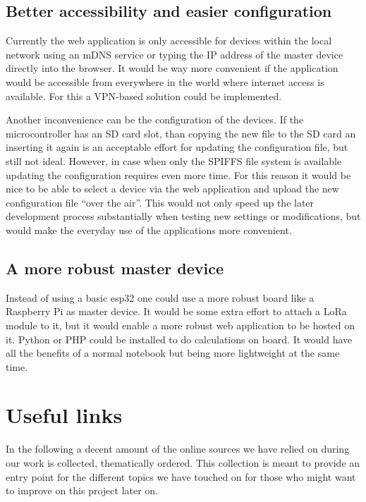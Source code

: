 \documentclass[11pt,a4paper]{article}
\numberwithin{equation}{section}   %
\numberwithin{figure}{section}     %
\numberwithin{table}{section}      %
\begin{document}
\subsection{Better accessibility and easier configuration}

Currently the web application is only accessible for devices within the local network using an mDNS service or typing the IP address of the master device directly into the browser.
It would be way more convenient if the application would be accessible from everywhere in the world where internet access is available. For this a VPN-based solution could be implemented.

Another inconvenience can be the configuration of the devices. If the microcontroller has an SD card slot, than copying the new file to the SD card an inserting it again is an acceptable effort for updating the configuration file, but still not ideal. However, in case when only the SPIFFS file system is available updating the configuration requires even more time. For this reason it would be nice to be able to select a device via the web application and upload the new configuration file ``over the air''.
This would not only speed up the later development process substantially when testing new settings or modifications, but would make the everyday use of the applications more convenient. 

\subsection{A more robust master device}

Instead of using a basic esp32 one could use a more robust board like a Raspberry Pi as master device. It would be some extra effort to attach a LoRa module to it, but it would enable a more robust web application to be hosted on it. Python or PHP could be installed to do calculations on board. It would have all the benefits of a normal notebook but being more lightweight at the same time.


\section{Useful links}

In the following a decent amount of the online sources we have relied on during our work is collected, thematically ordered. This collection is meant to provide an entry point for the different topics we have touched on for those who might want to improve on this project later on.
\end{document}
